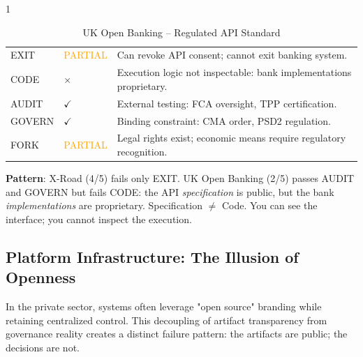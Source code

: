 \documentclass{article}
\begin{document}
\begin{table}[htbp]
    \begin{subtable}{1\textwidth}
        \centering
        \caption{UK Open Banking -- Regulated API Standard}
        \small
        \begin{tabular}{@{}llp{8.5cm}@{}}
            \toprule
            EXIT & \textcolor{orange}{PARTIAL} & Can revoke API consent; cannot exit banking system. \\
            CODE & $\times$ & Execution logic not inspectable: bank implementations proprietary. \\
            AUDIT & $\checkmark$ & External testing: FCA oversight, TPP certification. \\
            GOVERN & $\checkmark$ & Binding constraint: CMA order, PSD2 regulation. \\
            FORK & \textcolor{orange}{PARTIAL} & Legal rights exist; economic means require regulatory recognition. \\
            \bottomrule
        \end{tabular}
    \end{subtable}
\end{table}

\textbf{Pattern}: X-Road (4/5) fails only EXIT. UK Open Banking (2/5) passes AUDIT and GOVERN but fails CODE: the API \textit{specification} is public, but the bank \textit{implementations} are proprietary. Specification $\neq$ Code. You can see the interface; you cannot inspect the execution.

\subsection{Platform Infrastructure: The Illusion of Openness}

In the private sector, systems often leverage "open source" branding while retaining centralized control. This decoupling of artifact transparency from governance reality creates a distinct failure pattern: the artifacts are public; the decisions are not.
\end{document}
